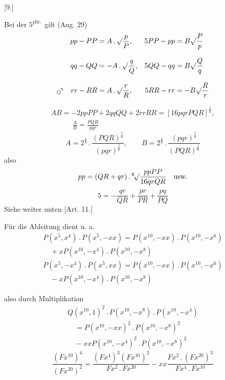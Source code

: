 \begingroup
\renewcommand{\arraystretch}{1.45}
\providecommand{\GaussCircleArrow}{\ensuremath{\mathord{\vcenter{\hbox{\setlength{\unitlength}{1pt}\begin{picture}(10,11)\linethickness{.55pt}\put(3.3,3.3){\circle{5.2}}\put(5.1,5.1){\line(1,1){3.2}}\put(5.6,8.3){\line(1,0){2.7}}\put(8.3,5.6){\line(0,1){2.7}}\end{picture}}}}}}

\par\medskip{}\centerline{[9.]}\nobreak\smallskip
Bei der $5^{\mathrm{plic.}}$ gilt (Aug. 29)
\[
\begin{aligned}
pp-PP&= A\,.\,\surd\frac{p}{P}, &5PP-pp&=B\surd\frac{P}{p}\\[8pt]
qq-QQ&=-A\,.\,\surd\frac{q}{Q}, &5QQ-qq&=B\surd\frac{Q}{q}\\[8pt]
\GaussCircleArrow\quad rr-RR&=A\,.\,\surd\frac{r}{R},
&5RR-rr&=-B\surd\frac{R}{r}
\end{aligned}
\]

\[
\begin{gathered}AB=-2ppPP+2qqQQ+2rrRR=[16pqrPQR]^{\frac23},
\\[8pt]\quad{}\qquad\frac{A}{B}=\frac{PQR}{pqr}\end{gathered}
\]
\[
A=2^{\frac43}\,.\,\frac{(PQR)^{\frac56}}{(pqr)^{\frac16}},
\qquad B=2^{\frac43}\,.\,\frac{(pqr)^{\frac56}}{(PQR)^{\frac16}}
\]
also
\[
pp=(QR+qr)\,.\,\mathord{{}^{6}\!\surd}\frac{ppPP}{16qrQR}\quad\text{usw.}
\]
\[
5=-\frac{qr}{QR}+\frac{pr}{PR}+\frac{pq}{PQ}
\]
Siehe weiter unten [Art. 11.]


Für die Ableitung dient u. a.
\[
\begin{gathered}
P(x^5,x^4)\,.\,P(x^5,-xx)
=P(x^{10},-xx)\,.\,P(x^{10},-x^6)\\[8pt]\quad{}+xP(x^{10},-x^4)\,.\,P(x^{10},-x^8)\\[8pt]
P(x^5,-x^4)\,.\,P(x^5,xx)
=P(x^{10},-xx)\,.\,P(x^{10},-x^6)\\[8pt]\quad{}-xP(x^{10},-x^4)\,.\,
P(x^{10},-x^8)
\end{gathered}
\]


also durch Multiplikation
\[
\begin{gathered}
Q(x^{10},1)^2\, .\,P(x^{10},-x^8)\, .\,P(x^{10},-x^4)\\[8pt]
\quad=P(x^{10},-xx)^2\, .\,P(x^{10},-x^6)^2\\[8pt]\quad{}-xxP(x^{10},-x^4)^2\, .\,P(x^{10},-x^8)^2
\end{gathered}
\]
\[
\frac{(Fx^{10})^4}{(Fx^{20})^2}
=\frac{(Fx^4)^3(Fx^{10})^2}{Fx^2\, .\,Fx^{20}}
-xx\frac{Fx^2\, .\,(Fx^{20})^3}{Fx^4\, .\,Fx^{10}}
\]

